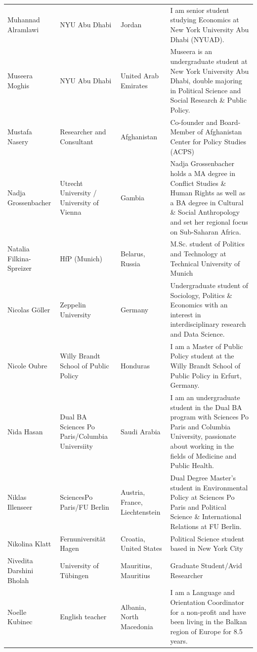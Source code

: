 \documentclass[]{article}
\begin{document}
\begin{longtable}{l>{\raggedright\arraybackslash}p{2cm}>{\raggedright\arraybackslash}p{2cm}>{\raggedright\arraybackslash}p{3cm}}
\rowcolor{gray!6}  Muhannad Alramlawi & NYU Abu Dhabi & Jordan & I am senior student studying Economics at New York University Abu Dhabi (NYUAD).\\
Museera Moghis & NYU Abu Dhabi & United Arab Emirates & Museera is an undergraduate student at New York University Abu Dhabi, double majoring in Political Science and Social Research \& Public Policy.\\
\addlinespace
\rowcolor{gray!6}  Mustafa Nasery & Researcher and Consultant & Afghanistan & Co-founder and Board-Member of Afghanistan Center for Policy Studies (ACPS)\\
Nadja Grossenbacher & Utrecht University / University of Vienna & Gambia & Nadja Grossenbacher holds a MA degree in Conflict Studies \& Human Rights as well as a BA degree in Cultural \& Social Anthropology and set her regional focus on Sub-Saharan Africa.\\
\rowcolor{gray!6}  Natalia Filkina-Spreizer & HfP (Munich) & Belarus, Russia & M.Sc. student of Politics and Technology at Technical University of Munich\\
Nicolas Göller & Zeppelin University & Germany & Undergraduate student of Sociology, Politics \& Economics with an interest in interdisciplinary research and Data Science.\\
\rowcolor{gray!6}  Nicole Oubre & Willy Brandt School of Public Policy & Honduras & I am a Master of Public Policy student at the Willy Brandt School of Public Policy in Erfurt, Germany.\\
\addlinespace
Nida Hasan & Dual BA Sciences Po Paris/Columbia Universiity & Saudi Arabia & I am an undergraduate student in the Dual BA program with Sciences Po Paris and Columbia University, passionate about working in the fields of Medicine and Public Health.\\
\rowcolor{gray!6}  Niklas Illenseer & SciencesPo Paris/FU Berlin & Austria, France, Liechtenstein & Dual Degree Master's student in Environmental Policy at Sciences Po Paris and Political Science \& International Relations at FU Berlin.\\
Nikolina Klatt & Fernuniversität Hagen & Croatia, United States & Political Science student based in New York City\\
\rowcolor{gray!6}  Nivedita Darshini Bholah & University of Tübingen & Mauritius, Mauritius & Graduate Student/Avid Researcher\\
Noelle Kubinec & English teacher & Albania, North Macedonia & I am a Language and Orientation Coordinator for a non-profit and have been living in the Balkan region of Europe for 8.5 years.\\

\end{longtable}
\end{document}
